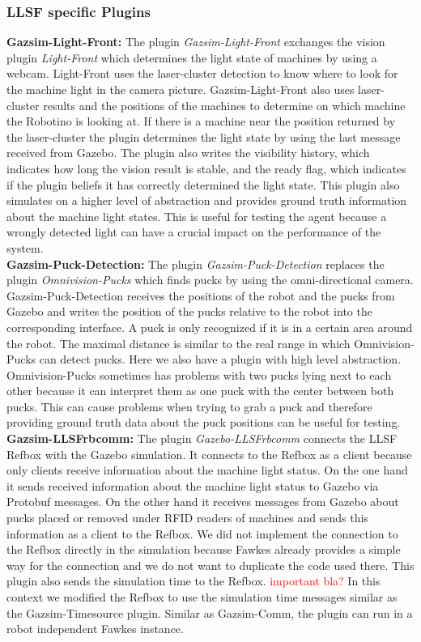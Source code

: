 \subsubsection{LLSF specific Plugins}
\textbf{Gazsim-Light-Front:}
The plugin \textit{Gazsim-Light-Front} exchanges the vision plugin \textit{Light-Front} which determines the light state of machines by using a webcam. Light-Front uses the laser-cluster detection to know where to look for the machine light in the camera picture. Gazsim-Light-Front also uses laser-cluster results and the positions of the machines to determine on which machine the Robotino is looking at. If there is a machine near the position returned by the laser-cluster the plugin determines the light state by using the last message received from Gazebo. The plugin also writes the visibility history, which indicates how long the vision result is stable, and the ready flag, which indicates if the plugin beliefs it has correctly determined the light state. This plugin also simulates on a higher level of abstraction and provides ground truth information about the machine light states. This is useful for testing the agent because a wrongly detected light can have a crucial impact on the performance of the system.
\\
\textbf{Gazsim-Puck-Detection:}
The plugin \textit{Gazsim-Puck-Detection} replaces the plugin \textit{Omnivision-Pucks} which finds pucks by using the omni-directional camera. Gazsim-Puck-Detection receives the positions of the robot and the pucks from Gazebo and writes the position of the pucks relative to the robot into the corresponding interface. A puck is only recognized if it is in a certain area around the robot. The maximal distance is similar to the real range in which Omnivision-Pucks can detect pucks. Here we also have a plugin with high level abstraction. Omnivision-Pucks sometimes has problems with two pucks lying next to each other because it can interpret them as one puck with the center between both pucks. This can cause problems when trying to grab a puck and therefore providing ground truth data about the puck positions can be useful for testing.
\\
\textbf{Gazsim-LLSFrbcomm:}
The plugin \textit{Gazebo-LLSFrbcomm} connects the LLSF Refbox with the Gazebo simulation. It connects to the Refbox as a client because only clients receive information about the machine light status. On the one hand it sends received information about the machine light status to Gazebo via Protobuf messages. On the other hand it receives messages from Gazebo about pucks placed or removed under RFID readers of machines and sends this information as a client to the Refbox. We did not implement the connection to the Refbox directly in the simulation because Fawkes already provides a simple way for the connection and we do not want to duplicate the code used there. This plugin also sends the simulation time to the Refbox. \textcolor{red}{important bla?} In this context we modified the Refbox to use the simulation time messages similar as the Gazsim-Timesource plugin. Similar as Gazsim-Comm, the plugin can run in a robot independent Fawkes instance.
